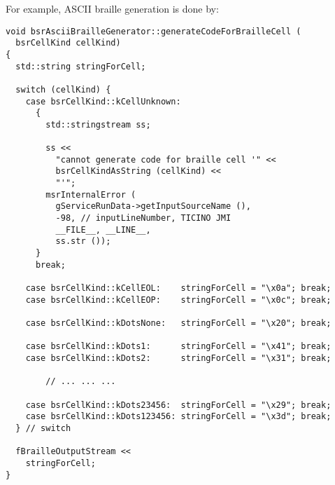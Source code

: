 For example, ASCII braille generation is done by:
\begin{lstlisting}[language=CPlusPlus]
void bsrAsciiBrailleGenerator::generateCodeForBrailleCell (
  bsrCellKind cellKind)
{
  std::string stringForCell;

  switch (cellKind) {
    case bsrCellKind::kCellUnknown:
      {
        std::stringstream ss;

        ss <<
          "cannot generate code for braille cell '" <<
          bsrCellKindAsString (cellKind) <<
          "'";
        msrInternalError (
          gServiceRunData->getInputSourceName (),
          -98, // inputLineNumber, TICINO JMI
          __FILE__, __LINE__,
          ss.str ());
      }
      break;

    case bsrCellKind::kCellEOL:    stringForCell = "\x0a"; break;
    case bsrCellKind::kCellEOP:    stringForCell = "\x0c"; break;

    case bsrCellKind::kDotsNone:   stringForCell = "\x20"; break;

    case bsrCellKind::kDots1:      stringForCell = "\x41"; break;
    case bsrCellKind::kDots2:      stringForCell = "\x31"; break;

		// ... ... ...

    case bsrCellKind::kDots23456:  stringForCell = "\x29"; break;
    case bsrCellKind::kDots123456: stringForCell = "\x3d"; break;
  } // switch

  fBrailleOutputStream <<
    stringForCell;
}
\end{lstlisting}

